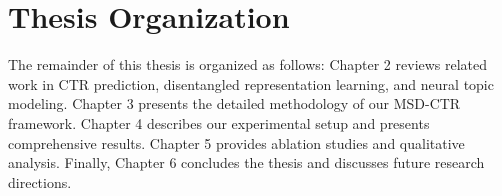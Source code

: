 \section{Thesis Organization}

The remainder of this thesis is organized as follows: Chapter 2 reviews related work in CTR prediction, disentangled representation learning, and neural topic modeling. Chapter 3 presents the detailed methodology of our MSD-CTR framework. Chapter 4 describes our experimental setup and presents comprehensive results. Chapter 5 provides ablation studies and qualitative analysis. Finally, Chapter 6 concludes the thesis and discusses future research directions.